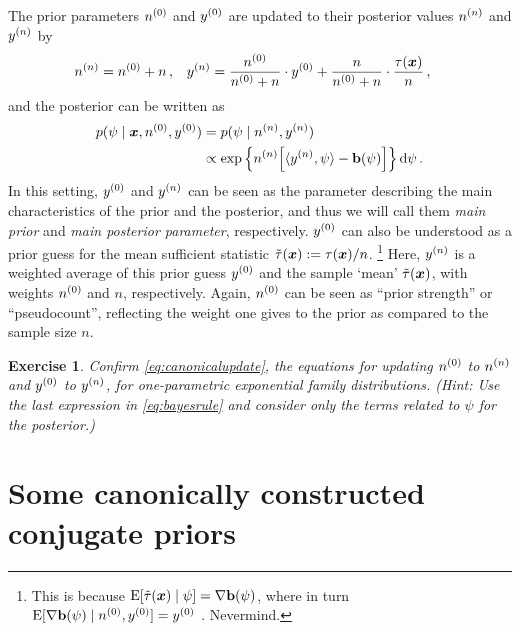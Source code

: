 \documentclass[12pt,a4paper	,twoside]{article}
\newcommand{\dd}{\,\mathrm{d}}
\newcommand{\mbf}[1]{\mathbf{#1}}
\newcommand{\bs}[1]{\boldsymbol{#1}}
\renewcommand{\vec}[1]{{\bs#1}}
\newcommand{\E}{\operatorname{E}}
\newtheorem{myex}{Exercise}
\begin{document}
The prior parameters $n^{(0)}$ and $y^{(0)}$ are updated to their posterior values $n^{(n)}$ and $y^{(n)}$ by
\begin{align}\label{eq:canonicalupdate}
\nn &= \nz + n\,, &
\yn &= \frac{\nz}{\nz + n} \cdot \yz + \frac{n}{\nz + n} \cdot \frac{\tau(\vec{x})}{n}\,,
\end{align}
and the posterior can be written as
\begin{align}\label{eq:canonicalposterior}
p(\psi \mid \vec{x}, \nz, \yz)
 &= p(\psi \mid \nn, \yn) \nonumber\\
 &\propto \exp\Big\{ \nn \Big[ \langle \yn, \psi \rangle - \mbf{b}(\psi) \Big] \Big\} \dd\psi\,.
\end{align}
In this setting, $y^{(0)}$ and $y^{(n)}$ can be seen as the parameter describing the main characteristics of the prior and the posterior,
and thus we will call them \emph{main prior} and \emph{main posterior parameter}, respectively.
$y^{(0)}$ can also be understood as a prior guess for the mean sufficient statistic $\ttau(\vec{x}) := \tau(\vec{x})/n$.%
\footnote{This is because $\E[\ttau(\vec{x}) \mid \psi] = \nabla\mbf{b}(\psi)$,
where in turn $\E[\nabla\mbf{b}(\psi) \mid \nz, \yz] = \yz$ \cite[e.g.,][Prop.~5.7, p.~275]{2000:bernardosmith}.
Nevermind.}
Here, $y^{(n)}$ is a weighted average of this prior guess $y^{(0)}$ and the sample `mean' $\ttau(\vec{x})$,
with weights $n^{(0)}$ and $n$, respectively.
Again, $n^{(0)}$ can be seen as ``prior strength'' or ``pseudocount'',
reflecting the weight one gives to the prior as compared to the sample size $n$.

\begin{myex}
Confirm \eqref{eq:canonicalupdate},
the equations for updating $n^{(0)}$ to $n^{(n)}$ and $y^{(0)}$ to $y^{(n)}$,
for one-parametric exponential family distributions.
(Hint: Use the last expression in \eqref{eq:bayesrule}
and consider only the terms related to $\psi$ for the posterior.)
\end{myex}


\section{Some canonically constructed conjugate priors}
\end{document}
